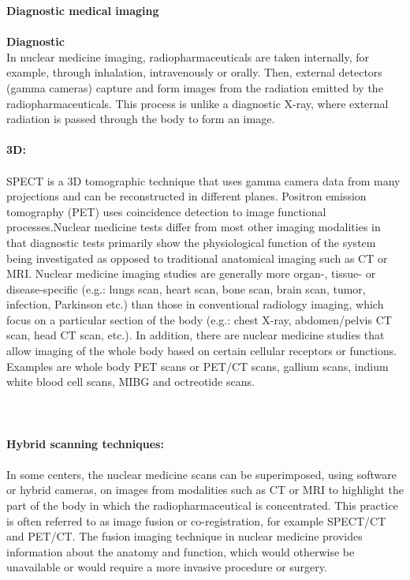 \documentclass[12pt]{article}
\begin{document}
\noindent \textbf{\large Diagnostic medical imaging} \\ \\ \noindent \textbf{\large Diagnostic } \\ In nuclear medicine imaging, radiopharmaceuticals are taken internally, for example, through inhalation, intravenously or orally. Then, external detectors (gamma cameras) capture and form images from the radiation emitted by the radiopharmaceuticals. This process is unlike a diagnostic X-ray, where external radiation is passed through the body to form an image. \\ \\ \noindent \textbf{\large 3D:} \\ \\ SPECT is a 3D tomographic technique that uses gamma camera data from many projections and can be reconstructed in different planes. Positron emission tomography (PET) uses coincidence detection to image functional processes.Nuclear medicine tests differ from most other imaging modalities in that diagnostic tests primarily show the physiological function of the system being investigated as opposed to traditional anatomical imaging such as CT or MRI. Nuclear medicine imaging studies are generally more organ-, tissue- or disease-specific (e.g.: lungs scan, heart scan, bone scan, brain scan, tumor, infection, Parkinson etc.) than those in conventional radiology imaging, which focus on a particular section of the body (e.g.: chest X-ray, abdomen/pelvis CT scan, head CT scan, etc.). In addition, there are nuclear medicine studies that allow imaging of the whole body based on certain cellular receptors or functions. Examples are whole body PET scans or PET/CT scans, gallium scans, indium white blood cell scans, MIBG and octreotide scans. \\ \\

\\ \\ \noindent \textbf{\large Hybrid scanning techniques:} \\ \\ In some centers, the nuclear medicine scans can be superimposed, using software or hybrid cameras, on images from modalities such as CT or MRI to highlight the part of the body in which the radiopharmaceutical is concentrated. This practice is often referred to as image fusion or co-registration, for example SPECT/CT and PET/CT. The fusion imaging technique in nuclear medicine provides information about the anatomy and function, which would otherwise be unavailable or would require a more invasive procedure or surgery.\\ \\
\end{document}
